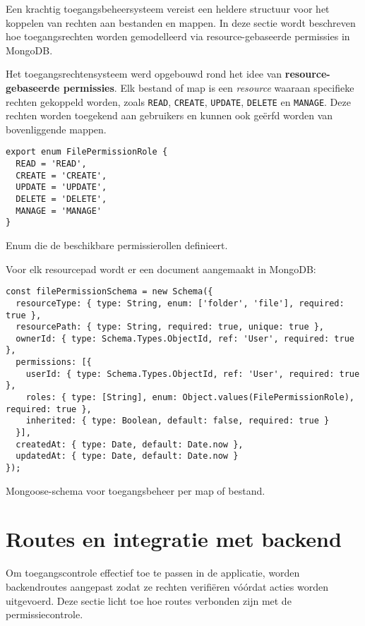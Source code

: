Een krachtig toegangsbeheersysteem vereist een heldere structuur voor het koppelen van rechten aan bestanden en mappen. In deze sectie wordt beschreven hoe toegangsrechten worden gemodelleerd via resource-gebaseerde permissies in MongoDB.

Het toegangsrechtensysteem werd opgebouwd rond het idee van \textbf{resource-gebaseerde permissies}. Elk bestand of map is een \emph{resource} waaraan specifieke rechten gekoppeld worden, zoals \texttt{READ}, \texttt{CREATE}, \texttt{UPDATE}, \texttt{DELETE} en \texttt{MANAGE}. Deze rechten worden toegekend aan gebruikers en kunnen ook geërfd worden van bovenliggende mappen.

\begin{listing}[H]
\begin{verbatim}
export enum FilePermissionRole {
  READ = 'READ',
  CREATE = 'CREATE',
  UPDATE = 'UPDATE',
  DELETE = 'DELETE',
  MANAGE = 'MANAGE'
}
\end{verbatim}
\caption[Permissierollen per bestand of map]{Enum die de beschikbare permissierollen definieert.}
\end{listing}

Voor elk resourcepad wordt er een document aangemaakt in MongoDB:

\begin{listing}[H]
\begin{verbatim}
const filePermissionSchema = new Schema({
  resourceType: { type: String, enum: ['folder', 'file'], required: true },
  resourcePath: { type: String, required: true, unique: true },
  ownerId: { type: Schema.Types.ObjectId, ref: 'User', required: true },
  permissions: [{
    userId: { type: Schema.Types.ObjectId, ref: 'User', required: true },
    roles: { type: [String], enum: Object.values(FilePermissionRole), required: true },
    inherited: { type: Boolean, default: false, required: true }
  }],
  createdAt: { type: Date, default: Date.now },
  updatedAt: { type: Date, default: Date.now }
});
\end{verbatim}
\caption[Schema voor FilePermission documenten]{Mongoose-schema voor toegangsbeheer per map of bestand.}
\end{listing}

\section{Routes en integratie met backend}
\label{sec:routes-backend}

Om toegangscontrole effectief toe te passen in de applicatie, worden backendroutes aangepast zodat ze rechten verifiëren vóórdat acties worden uitgevoerd. Deze sectie licht toe hoe routes verbonden zijn met de permissiecontrole.

